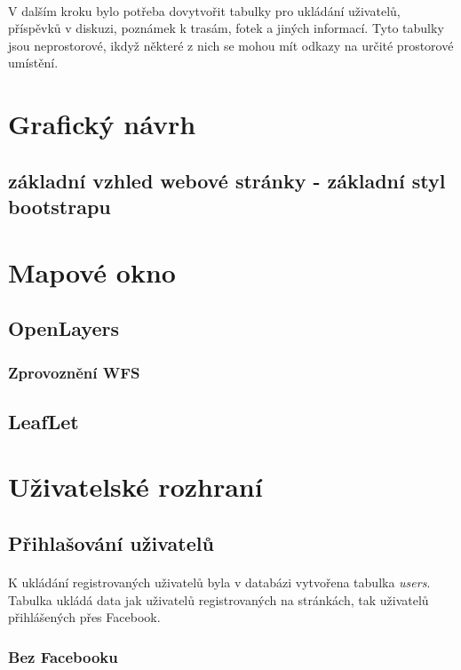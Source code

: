 \documentclass[11pt,a4paper,titlepage,oneside]{book}
\begin{document}
				\paragraph{} V dalším kroku bylo potřeba dovytvořit tabulky pro ukládání uživatelů, příspěvků v  diskuzi, poznámek k trasám, fotek a jiných informací. Tyto tabulky jsou neprostorové, ikdyž některé z nich se mohou mít odkazy na určité prostorové umístění.

		\section{Grafický návrh}
			\subsection{základní vzhled webové stránky - základní styl bootstrapu}
		\section{Mapové okno}
			\subsection{OpenLayers}
				\subsubsection{Zprovoznění WFS}
			\subsection{LeafLet}

		\section{Uživatelské rozhraní}
			\subsection{Přihlašování uživatelů}
				\paragraph{}K ukládání registrovaných uživatelů byla v databázi vytvořena tabulka \textit{users}. Tabulka ukládá data jak uživatelů registrovaných na stránkách, tak uživatelů přihlášených přes Facebook.
				\subsubsection{Bez Facebooku}
\end{document}
